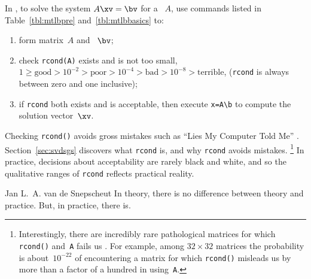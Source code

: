 \begin{procedure} \label{pro:unisol}
In \script, to solve the system \(A\xv=\bv\) for a ~\(A\), use commands listed in Table~\ref{tbl:mtlbpre} and~\ref{tbl:mtlbbasics} to:
\begin{enumerate}
\item form matrix~\(A\) and ~\(\bv\);
\item check \verb|rcond(A)| exists and is not too small, \(1\geq\text{good} >10^{-2} >\text{poor} >10^{-4} >\text{bad} >10^{-8} >\text{terrible}\), (\verb|rcond| is always between zero and one inclusive);
\item if \verb|rcond| both exists and is acceptable, then execute \verb|x=A\b| to compute the solution vector~\(\xv\). 
\end{enumerate}
\end{procedure}

Checking \verb|rcond()| avoids gross mistakes such as  ``Lies My Computer Told Me'' .
Section~\ref{sec:svdsgs} discovers what \verb|rcond| is, and why \verb|rcond| avoids mistakes.
\footnote{Interestingly, there are incredibly rare pathological matrices for which \texttt{rcond()} and~\texttt{A\slosh} fails us \cite[]{Driscoll07}.  For example, among \(32\times32\) matrices the probability is about~\(10^{-22}\) of encountering a matrix for which \texttt{rcond()} misleads us by more than a factor of a hundred in using~\texttt{A\slosh}.}
In practice, decisions about acceptability are rarely black and white, and so the qualitative ranges of \verb|rcond| reflects practical reality.

\begin{quoted}{Jan L.~A. van de Snepscheut}
In theory, there is no difference between theory and practice. 
But, in practice, there is. 
\end{quoted}



